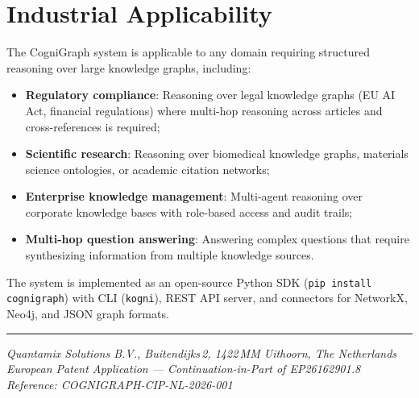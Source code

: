 \documentclass[a4paper,12pt]{article}
\begin{document}
\section*{Industrial Applicability}

\noindent The CogniGraph system is applicable to any domain requiring structured reasoning over large knowledge graphs, including:

\begin{itemize}[nosep,leftmargin=2em]
\item \textbf{Regulatory compliance}: Reasoning over legal knowledge graphs (EU AI Act, financial regulations) where multi-hop reasoning across articles and cross-references is required;
\item \textbf{Scientific research}: Reasoning over biomedical knowledge graphs, materials science ontologies, or academic citation networks;
\item \textbf{Enterprise knowledge management}: Multi-agent reasoning over corporate knowledge bases with role-based access and audit trails;
\item \textbf{Multi-hop question answering}: Answering complex questions that require synthesizing information from multiple knowledge sources.
\end{itemize}

\vspace{2mm}

\noindent The system is implemented as an open-source Python SDK (\texttt{pip install cognigraph}) with CLI (\texttt{kogni}), REST API server, and connectors for NetworkX, Neo4j, and JSON graph formats.

\vspace{15mm}

\noindent\rule{\textwidth}{0.4pt}

\begin{center}
{\small\itshape Quantamix Solutions B.V., Buitendijks\,2, 1422\,MM Uithoorn, The Netherlands\\
European Patent Application --- Continuation-in-Part of EP26162901.8\\
Reference: COGNIGRAPH-CIP-NL-2026-001}
\end{center}
\end{document}
